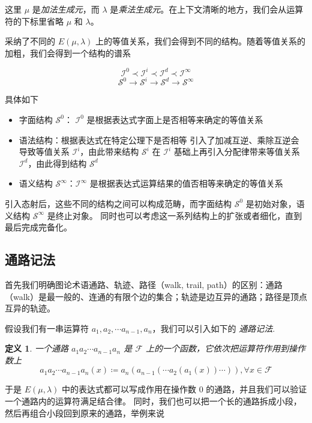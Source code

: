 \documentclass[a4paper,12pt]{article}
\newtheorem{definition}{定义}
\numberwithin{definition}{section}
\numberwithin{lemma}{section}
\numberwithin{proposition}{section}
\numberwithin{theorem}{section}
\numberwithin{grammar}{section}
\numberwithin{program}{section}
\numberwithin{convention}{section}
\numberwithin{corollary}{section}
\begin{document}
这里 $\mu$ 是\emph{加法生成元}，而 $\lambda$ 是\emph{乘法生成元}。在上下文清晰的地方，我们会从运算符的下标里省略 $\mu$ 和 $\lambda$。

采纳了不同的 $E(\mu, \lambda)$ 上的等值关系，我们会得到不同的结构。随着等值关系的加粗，我们会得到一个结构的谱系

$$
  \mathcal{I}^0 \prec \mathcal{I}^i \prec \mathcal{I}^d \prec \mathcal{I}^\infty
$$
$$
  \mathcal{S}^0 \to \mathcal{S}^i \to \mathcal{S}^d \to \mathcal{S}^\infty
$$

具体如下

\begin{itemize}
    \item 字面结构 $\mathcal{S}^0$： $\mathcal{I}^0$ 是根据表达式字面上是否相等来确定的等值关系
    \item 语法结构：根据表达式在特定公理下是否相等
        \subitem 引入了加减互逆、乘除互逆会导致等值关系 $\mathcal{I}^i$，由此带来结构 $\mathcal{S}^i$
        \subitem 在 $\mathcal{I}^i$ 基础上再引入分配律带来等值关系 $\mathcal{I}^d$，由此得到结构 $\mathcal{S}^d$
    \item 语义结构 $\mathcal{S}^\infty$：$\mathcal{I}^\infty$ 是根据表达式运算结果的值否相等来确定的等值关系
\end{itemize}

引入态射后，这些不同的结构之间可以构成范畴，而字面结构 $\mathcal{S}^0$ 是初始对象，语义结构 $\mathcal{S}^\infty$ 是终止对象。
同时也可以考虑这一系列结构上的扩张或者细化，直到最后完成完备化。

\subsection{通路记法}\label{subsec:walknotion}

首先我们明确图论术语通路、轨迹、路径（walk, trail, path）的区别：通路（walk）是最一般的、连通的有限个边的集合；轨迹是边互异的通路；路径是顶点互异的轨迹。

假设我们有一串运算符 $a_1, a_2, \cdots a_{n-1}, a_n$，我们可以引入如下的 \emph{通路记法}.

\begin{definition}
\label{definition:path}
    一个通路 $a_1 a_2 \cdots a_{n-1} a_n$ 是 $\mathcal{F}$ 上的一个函数，它依次把运算符作用到操作数上
    $$a_1 a_2 \cdots a_{n-1} a_n (x) \coloneqq a_n( a_{n-1}( \cdots a_2( a_1(x) ) \cdots ) ), \forall x \in \mathcal{F}$$
\end{definition}

于是 $E(\mu, \lambda)$ 中的表达式都可以写成作用在操作数 $0$ 的通路，并且我们可以验证一个通路内的运算符满足结合律。
同时，我们也可以把一个长的通路拆成小段，然后再组合小段回到原来的通路，举例来说
\end{document}
